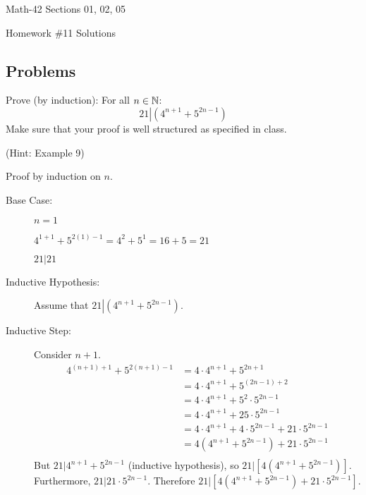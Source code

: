 \documentclass[letterpaper,12pt,fleqn]{article}
\begin{document}
\begin{center}
  \large
  Math-42 Sections 01, 02, 05

  \Large
  Homework \#11 Solutions
\end{center}

\subsection*{Problems}

Prove (by induction): For all \(n\in\mathbb{N}\):
\[21\left|\left(4^{n+1}+5^{2n-1}\right)\right.\]
Make sure that your proof is well structured as specified in class.

(Hint: Example 9)

Proof by induction on \(n\).

\begin{description}
\item[Base Case:] \(n=1\)

  \(4^{1+1}+5^{2(1)-1}=4^2+5^1=16+5=21\)

  \(21|21\)

\item[Inductive Hypothesis:] Assume that \(21\left|\left(4^{n+1}+5^{2n-1}\right)\right.\).

\item[Inductive Step:] Consider \(n+1\).
  \begin{align*}
    4^{(n+1)+1}+5^{2(n+1)-1} &= 4\cdot4^{n+1}+5^{2n+1} \\
    &= 4\cdot4^{n+1}+5^{(2n-1)+2} \\
    &= 4\cdot4^{n+1}+5^2\cdot5^{2n-1} \\
    &= 4\cdot4^{n+1}+25\cdot5^{2n-1} \\
    &= 4\cdot4^{n+1}+4\cdot5^{2n-1}+21\cdot5^{2n-1} \\
    &= 4(4^{n+1}+5^{2n-1})+21\cdot5^{2n-1} \\
  \end{align*}
  But \(21|4^{n+1}+5^{2n-1}\) (inductive hypothesis), so \(21|[4(4^{n+1}+5^{2n-1})]\).  Furthermore, \(21|21\cdot5^{2n-1}\).
  Therefore \(21|[4(4^{n+1}+5^{2n-1})+21\cdot5^{2n-1}]\).
\end{description}
\end{document}
